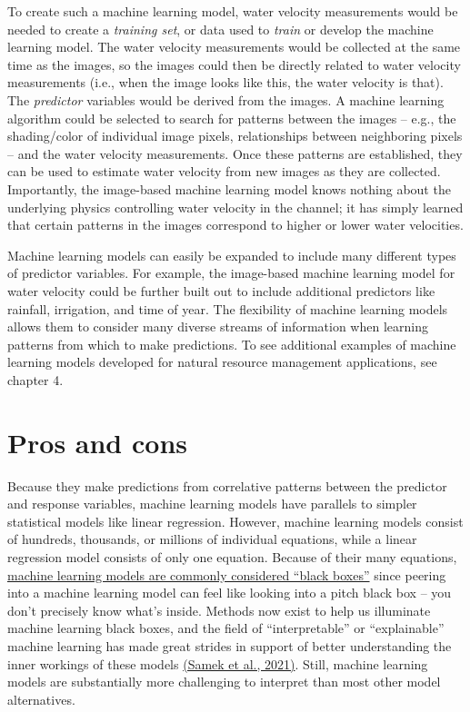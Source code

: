 \documentclass[
]{book}
\begin{document}
To create such a machine learning model, water velocity measurements would be needed to create a \emph{training set}, or data used to \emph{train} or develop the machine learning model. The water velocity measurements would be collected at the same time as the images, so the images could then be directly related to water velocity measurements (i.e., when the image looks like this, the water velocity is that). The \emph{predictor} variables would be derived from the images. A machine learning algorithm could be selected to search for patterns between the images -- e.g., the shading/color of individual image pixels, relationships between neighboring pixels -- and the water velocity measurements. Once these patterns are established, they can be used to estimate water velocity from new images as they are collected. Importantly, the image-based machine learning model knows nothing about the underlying physics controlling water velocity in the channel; it has simply learned that certain patterns in the images correspond to higher or lower water velocities.

Machine learning models can easily be expanded to include many different types of predictor variables. For example, the image-based machine learning model for water velocity could be further built out to include additional predictors like rainfall, irrigation, and time of year. The flexibility of machine learning models allows them to consider many diverse streams of information when learning patterns from which to make predictions. To see additional examples of machine learning models developed for natural resource management applications, see chapter 4.

\hypertarget{pros-and-cons}{%
\section{Pros and cons}\label{pros-and-cons}}

Because they make predictions from correlative patterns between the predictor and response variables, machine learning models have parallels to simpler statistical models like linear regression. However, machine learning models consist of hundreds, thousands, or millions of individual equations, while a linear regression model consists of only one equation. Because of their many equations, \href{https://www.nature.com/news/can-we-open-the-black-box-of-ai-1.20731}{machine learning models are commonly considered ``black boxes''} since peering into a machine learning model can feel like looking into a pitch black box -- you don't precisely know what's inside. Methods now exist to help us illuminate machine learning black boxes, and the field of ``interpretable'' or ``explainable'' machine learning has made great strides in support of better understanding the inner workings of these models \href{https://doi.org/10.1109/JPROC.2021.3060483}{(Samek et al., 2021)}. Still, machine learning models are substantially more challenging to interpret than most other model alternatives.
\end{document}
